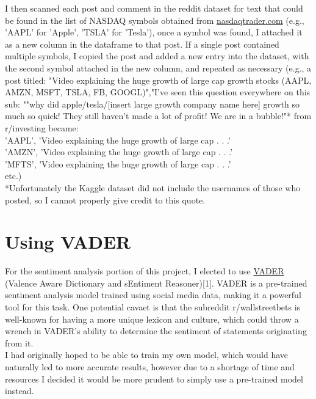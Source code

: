 \documentclass[11pt]{article}
\begin{document}
    I then scanned each post and comment in the reddit dataset for text that
    could be found in the list of NASDAQ symbols obtained from
    \href{https://www.nasdaqtrader.com/dynamic/SymDir/nasdaqtraded.txt}
    {nasdaqtrader.com} (e.g., 'AAPL' for 'Apple', 'TSLA' for 'Tesla'), once a
    symbol was found, I attached it as a new column in the dataframe to that
    post. If a single post contained multiple symbols, I copied the post and
    added a new entry into the dataset, with the second symbol attached in the
    new column, and repeated as necessary (e.g., a post titled: "Video
    explaining the huge growth of large cap growth stocks (AAPL, AMZN, MSFT,
    TSLA, FB, GOOGL)","I've seen this question everywhere on this sub: ""why
    did apple/tesla/[insert large growth company name here] growth so much so
    quick! They still haven't made a lot of profit! We are in a bubble!"* from
    r/investing became:\\

    \noindent'AAPL', 'Video explaining the huge growth of large cap . . .'\\
    'AMZN', 'Video explaining the huge growth of large cap . . .'\\
    'MFTS', 'Video explaining the huge growth of large cap . . .'\\
    etc.)\\

    *Unfortunately the Kaggle dataset did not include the usernames of those
    who posted, so I cannot properly give credit to this quote.
\section{Using VADER}
   For the sentiment analysis portion of this project, I elected to use
   \href{https://github.com/cjhutto/vaderSentiment}{VADER} (Valence Aware
   Dictionary and sEntiment Reasoner)[1]. VADER is a pre-trained sentiment
   analysis model trained using social media data, making it a powerful tool
   for this task. One potential cavaet is that the subreddit r/wallstreetbets
   is well-known for having a more unique lexicon and culture, which could
   throw a wrench in VADER's ability to determine the sentiment of statements
   originating from it.\\

   I had originally hoped to be able to train my own model, which would have
   naturally led to more accurate results, however due to a shortage of time
   and resources I decided it would be more prudent to simply use a
   pre-trained model instead.\\
\end{document}
